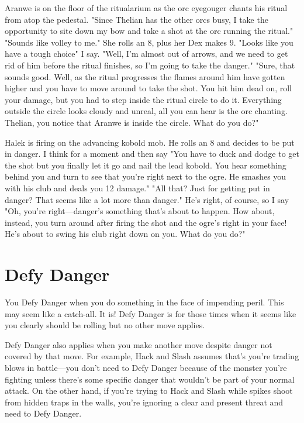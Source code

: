  
\startExample
Aranwe is on the floor of the ritualarium as the orc eyegouger chants his ritual from atop the pedestal. "Since Thelian has the other orcs busy, I take the opportunity to site down my bow and take a shot at the orc running the ritual." "Sounds like volley to me." She rolls an 8, plus her Dex makes 9. "Looks like you have a tough choice" I say. "Well, I'm almost out of arrows, and we need to get rid of him before the ritual finishes, so I'm going to take the danger." "Sure, that sounds good. Well, as the ritual progresses the flames around him have gotten higher and you have to move around to take the shot. You hit him dead on, roll your damage, but you had to step inside the ritual circle to do it. Everything outside the circle looks cloudy and unreal, all you can hear is the orc chanting. Thelian, you notice that Aranwe is inside the circle. What do you do?"
\stopExample
 
\startExample
Halek is firing on the advancing kobold mob. He rolls an 8 and decides to be put in danger. I think for a moment and then say "You have to duck and dodge to get the shot but you finally let it go and nail the lead kobold. You hear something behind you and turn to see that you're right next to the ogre. He smashes you with his club and deals you 12 damage." "All that? Just for getting put in danger? That seems like a lot more than danger." He's right, of course, so I say "Oh, you're right—danger's something that's about to happen. How about, instead, you turn around after firing the shot and the ogre's right in your face! He's about to swing his club right down on you. What do you do?"
\stopExample
 
\section{Defy Danger}    
 

You Defy Danger when you do something in the face of impending peril. This may seem like a catch-all. It is! Defy Danger is for those times when it seems like you clearly should be rolling but no other move applies.

 

Defy Danger also applies when you make another move despite danger not covered by that move. For example, Hack and Slash assumes that's you're trading blows in battle—you don't need to Defy Danger because of the monster you're fighting unless there's some specific danger that wouldn't be part of your normal attack. On the other hand, if you're trying to Hack and Slash while spikes shoot from hidden traps in the walls, you're ignoring a clear and present threat and need to Defy Danger.

